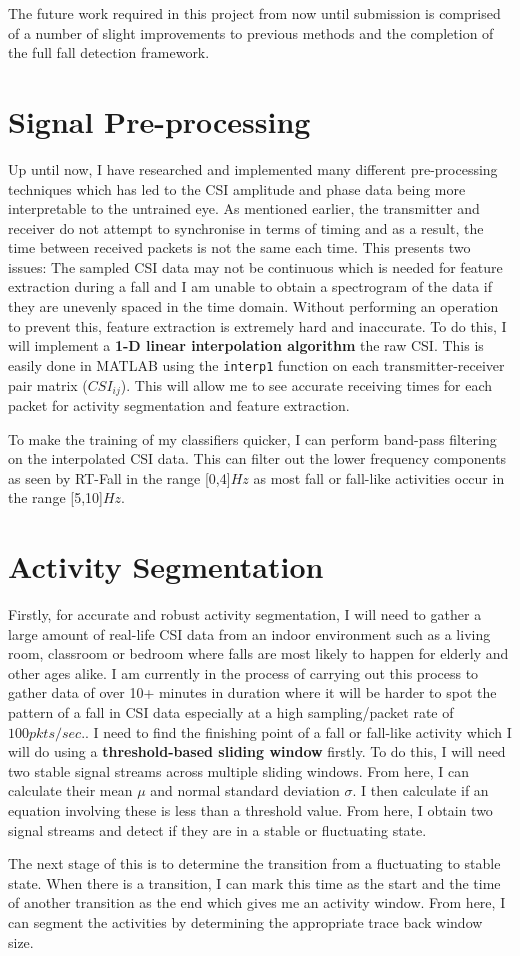 The future work required in this project from now until submission is comprised of a number of slight improvements to previous methods and the completion of the full fall detection framework. 
\section{Signal Pre-processing}
Up until now, I have researched and implemented many different pre-processing techniques which has led to the CSI amplitude and phase data being more interpretable to the untrained eye. As mentioned earlier, the transmitter and receiver do not attempt to synchronise in terms of timing and as a result, the time between received packets is not the same each time. This presents two issues: The sampled CSI data may not be continuous which is needed for feature extraction during a fall and I am unable to obtain a spectrogram of the data if they are unevenly spaced in the time domain. Without performing an operation to prevent this, feature extraction is extremely hard and inaccurate. To do this, I will implement a \textbf{ 1-D linear interpolation algorithm} the raw CSI. This is easily done in MATLAB using the \lstinline{interp1} function on each transmitter-receiver pair matrix ($CSI_{ij}$). This will allow me to see accurate receiving times for each packet for activity segmentation and feature extraction. \par
To make the training of my classifiers quicker, I can perform band-pass filtering on the interpolated CSI data. This can filter out the lower frequency components as seen by RT-Fall in the range [0,4]$Hz$ as most fall or fall-like activities occur in the range [5,10]$Hz$. 
\section{Activity Segmentation}
Firstly, for accurate and robust activity segmentation, I will need to gather a large amount of real-life CSI data from an indoor environment such as a living room, classroom or bedroom where falls are most likely to happen for elderly and other ages alike. I am currently in the process of carrying out this process to gather data of over 10+ minutes in duration where it will be harder to spot the pattern of a fall in CSI data especially at a high sampling/packet rate of $100pkts/sec.$. I need to find the finishing point of a fall or fall-like activity which I will do using a \textbf{threshold-based sliding window} firstly. To do this, I will need two stable signal streams across multiple sliding windows. From here, I can calculate their mean $\mu$ and normal standard deviation $\sigma$. I then calculate if an equation involving these is less than a threshold value. From here, I obtain two signal streams and detect if they are in a stable or fluctuating state. \par
The next stage of this is to determine the transition from a fluctuating to stable state. When there is a transition, I can mark this time as the start and the time of another transition as the end which gives me an activity window. From here, I can segment the activities by determining the appropriate trace back window size. 
